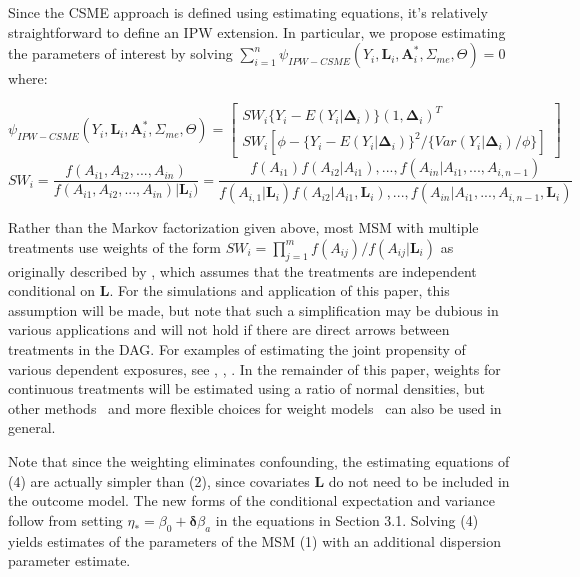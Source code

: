 \documentclass[useAMS,usenatbib,referee]{biom}
\begin{document}
Since the CSME approach is defined using estimating equations, it's relatively straightforward to define an IPW extension. In particular, we propose estimating the parameters of interest by solving $\sum_{i=1}^{n} \psi_{IPW-CSME}(Y_{i}, \bm{L}_{i}, \bm{A}^{*}_{i}, \Sigma_{me}, \Theta) = 0$ where:

\begin{equation}
    \psi_{IPW-CSME}(Y_{i}, \bm{L}_{i}, \bm{A}^{*}_{i}, \Sigma_{me}, \Theta) =
    \begin{bmatrix}
       SW_{i} \{ Y_{i} - E(Y_{i} | \bm{\Delta}_{i}) \} (1, \bm{\Delta}_{i})^{T} \\
       SW_{i} \left [ \phi - \{ Y_{i} - E(Y_{i} | \bm{\Delta}_{i})\}^{2} / \{ Var(Y_{i} | \bm{\Delta}_{i}) / \phi \} \right ]
    \end{bmatrix}
\end{equation}
\begin{equation*}
SW_{i} = \frac{f(A_{i1}, A_{i2}, ..., A_{in})}{f(A_{i1}, A_{i2}, ..., A_{in}) | \bm{L}_{i})} = \frac{f(A_{i1})f(A_{i2} | A_{i1}), ..., f(A_{in} | A_{i1}, ..., A_{i,n-1})}{f(A_{i,1} | \bm{L}_{i})f(A_{i2} | A_{i1}, \bm{L}_{i}), ..., f(A_{in} | A_{i1}, ..., A_{i,n-1}, \bm{L}_{i})}
\end{equation*}

Rather than the Markov factorization given above, most MSM with multiple treatments use weights of the form $SW_{i} = \prod_{j=1}^{m} f(A_{ij}) / f(A_{ij} | \bm{L}_{i})$ as originally described by \citet{hernan2001}, which assumes that the treatments are independent conditional on $\bm{L}$. For the simulations and application of this paper, this assumption will be made, but note that such a simplification may be dubious in various applications and will not hold if there are direct arrows between treatments in the DAG. For examples of estimating the joint propensity of various dependent exposures, see \citet{tchetgen2012}, \citet{perez2014}, \citet*{liu2016}. In the remainder of this paper, weights for continuous treatments will be estimated using a ratio of normal densities, but other methods~\citep{hirano2004} and more flexible choices for weight models~\citep{naimi2014} can also be used in general.

Note that since the weighting eliminates confounding, the estimating equations of (4) are actually simpler than (2), since covariates $\bm{L}$ do not need to be included in the outcome model. The new forms of the conditional expectation and variance follow from setting $\eta_{*} = \beta_{0} + \bm{\delta}\beta_{a}$ in the equations in Section 3.1. Solving (4) yields estimates of the parameters of the MSM (1) with an additional dispersion parameter estimate.
\end{document}

